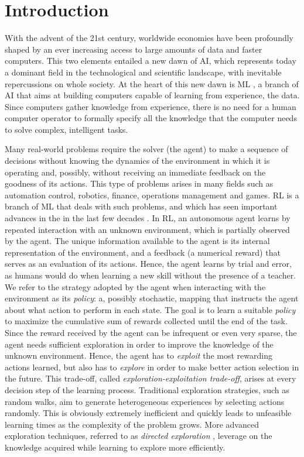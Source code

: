 
\chapter{Introduction}

With the advent of the 21st century, worldwide economies have been profoundly shaped by an ever increasing access to large amounts of data and faster computers. This two elements entailed a new dawn of \gls{AI}, which represents today a dominant field in the technological and scientific landscape, with inevitable repercussions on whole society. At the heart of this new dawn is \gls{ML} \cite{goodfellow2016deep}, a branch of \gls{AI} that aims at building computers capable of learning from experience, \ie the data. Since computers gather knowledge from experience, there is no need for a human computer operator to formally specify all the knowledge that the computer needs to solve complex, intelligent tasks.

Many real-world problems require the solver (the agent) to make a sequence of decisions without knowing the dynamics of the environment in which it is operating and, possibly, without receiving an immediate feedback on the goodness of its actions. This type of problems arises in many fields such as automation control, robotics, finance, operations management and games. \gls{RL} is a branch of \gls{ML} that deals with such problems, and which has seen important advances in the in the last few decades \cite{sutton2018reinforcement}. In \gls{RL}, an autonomous agent learns by repeated interaction with an unknown environment, which is partially observed by the agent. The unique information available to the agent is its internal representation of the environment, and a feedback (a numerical reward) that serves as an evaluation of its actions. Hence, the agent learns by trial and error, as humans would do when learning a new skill without the presence of a teacher. We refer to the strategy adopted by the agent when interacting with the environment as its \emph{policy}: a, possibly stochastic, mapping that instructs the agent about what action to perform in each state. The goal is to learn a suitable \emph{policy} to maximize the cumulative sum of rewards collected until the end of the task. Since the reward received by the agent can be infrequent or even very sparse, the agent needs sufficient exploration in order to improve the knowledge of the unknown environment. Hence, the agent has to \emph{exploit} the most rewarding actions learned, but also has to \emph{explore} in order to make better action selection in the future. This trade-off, called \emph{exploration-exploitation trade-off}, arises at every decision step of the learning process. Traditional exploration strategies, such as random walks, aim to generate heterogeneous experiences by selecting actions randomly. This is obviously extremely inefficient and quickly leads to unfeasible learning times as the complexity of the problem grows. More advanced exploration techniques, referred to as \emph{directed exploration} \cite{thrun1992efficient}, leverage on the knowledge acquired while learning to explore more efficiently.

